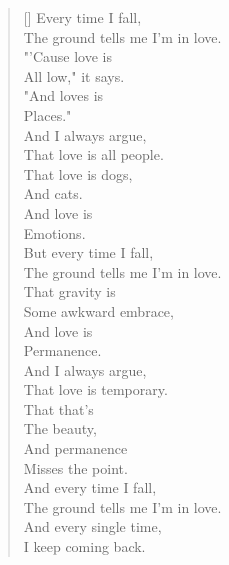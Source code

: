 \begin{verse}[\textwidth]
Every time I fall,\\
\vin The ground tells me I'm in love.\\
"'Cause love is\\
\vin All low," it says.\\
"And loves is\\
\vin Places."\\

And I always argue,\\
\vin That love is all people.\\
That love is dogs,\\
\vin And cats.\\
And love is\\
\vin Emotions.\\

But every time I fall,\\
\vin The ground tells me I'm in love.\\
That gravity is\\
\vin Some awkward embrace,\\
And love is\\
\vin Permanence.\\

And I always argue,\\
\vin That love is temporary.\\
That that's\\
\vin The beauty,\\
And permanence\\
\vin Misses the point.\\

And every time I fall,\\
\vin The ground tells me I'm in love.\\
And every single time,\\
\vin I keep coming back.
\end{verse}
